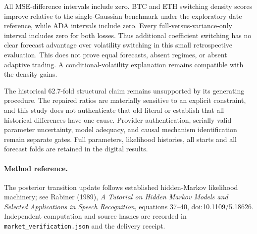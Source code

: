 \documentclass[11pt]{article}
\begin{document}
All MSE-difference intervals include zero. BTC and ETH switching density scores improve relative to the single-Gaussian benchmark under the exploratory date reference, while ADA intervals include zero. Every full-versus-variance-only interval includes zero for both losses. Thus additional coefficient switching has no clear forecast advantage over volatility switching in this small retrospective evaluation. This does not prove equal forecasts, absent regimes, or absent adaptive trading. A conditional-volatility explanation remains compatible with the density gains.

The historical 62.7-fold structural claim remains unsupported by its generating procedure. The repaired ratios are materially sensitive to an explicit constraint, and this study does not authenticate that old literal or establish that all historical differences have one cause. Provider authentication, serially valid parameter uncertainty, model adequacy, and causal mechanism identification remain separate gates. Full parameters, likelihood histories, all starts and all forecast folds are retained in the digital results.

\paragraph{Method reference.} The posterior transition update follows established hidden-Markov likelihood machinery; see Rabiner (1989), \emph{A Tutorial on Hidden Markov Models and Selected Applications in Speech Recognition}, equations 37--40, \href{https://doi.org/10.1109/5.18626}{doi:10.1109/5.18626}. Independent computation and source hashes are recorded in \texttt{market\_verification.json} and the delivery receipt.
\end{document}
